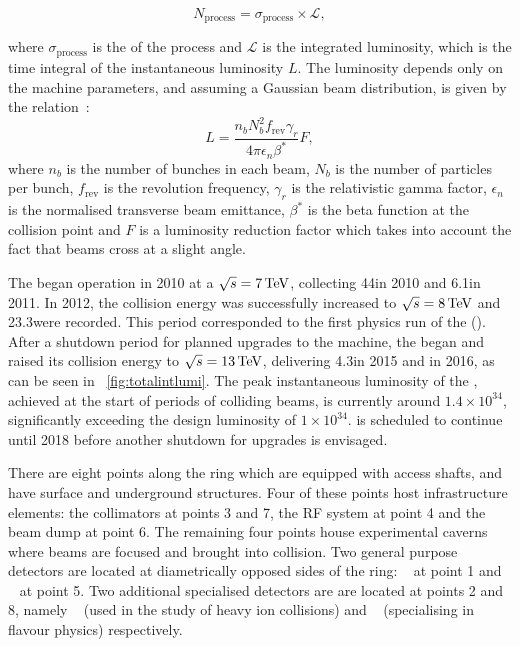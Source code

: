\begin{equation}
\label{eq:NeqSigmaL}
  N_{\text{process}} = \sigma_{\text{process}}\times \mathcal{L},
\end{equation}

where $\sigma_{\text{process}}$ is the \crosssection of the process and $\mathcal{L}$ is the integrated luminosity, which is the time integral of the instantaneous luminosity $L$. The luminosity depends only on the machine parameters, and assuming a Gaussian beam distribution, is given by the relation~\cite{Benedikt:823808}:
\begin{equation}
\label{eq:NeqSigmaL}
  L = \frac{n_{b} N^{2}_{b} f_{\text{rev}} \gamma_{r}}{4 \pi \epsilon_{n} \beta^{*}} F,
\end{equation}
where $n_{b}$ is the number of bunches in each beam, $N_{b}$ is the number of particles per bunch,  $f_{\text{rev}}$ is the revolution frequency,  $\gamma_{r}$ is the relativistic gamma factor, $\epsilon_{n}$ is the normalised transverse beam emittance, $\beta^{*}$ is the beta function at the collision point  and $F$ is a luminosity reduction factor which takes into account the fact that beams cross at a slight angle. 

The \LHC began operation in 2010 at a $\sqrt{s}=7\,\text{Te\hspace{-.08em}V}$, collecting 44\ipb in 2010 and 6.1\ifb in 2011. In 2012, the collision energy was successfully increased to $\sqrt{s}=8\,\text{Te\hspace{-.08em}V}$ and 23.3\ifb were recorded. This period corresponded to the first physics run of the \LHC (\RunI). After a shutdown period for planned upgrades to the machine, the \LHC began \RunII and raised its collision energy to $\sqrt{s}=13\,\text{Te\hspace{-.08em}V}$, delivering 4.3\ifb in 2015 and \totaldatatwentysixteen\ifb in 2016, as can be seen in \Fig~\ref{fig:totalintlumi}. The peak instantaneous luminosity of the \LHC, achieved at the start of periods of colliding beams, is currently around $1.4 \times 10^{34}$\lumiunits, significantly exceeding the design luminosity of $1 \times 10^{34}$\lumiunits. \RunII is scheduled to continue until 2018 before another shutdown for upgrades is envisaged. 

There are eight points along the \LHC ring which are equipped with access shafts, and have surface and underground structures. Four of these points host \LHC infrastructure elements: the collimators at points 3 and 7, the RF system at point 4 and the beam dump at point 6. The remaining four points house experimental caverns where beams are focused and brought into collision. Two general purpose detectors are located at diametrically opposed sides of the ring: \ATLAS~\cite{AtlasatLHC} at point 1 and \CMS~\cite{CMSatLHC} at point 5. Two additional specialised detectors are are located at points 2 and 8, namely \ALICE~\cite{AliceatLHC} (used in the study of heavy ion collisions) and \LHCb~\cite{LHCbatLHC} (specialising in flavour physics) respectively. 

